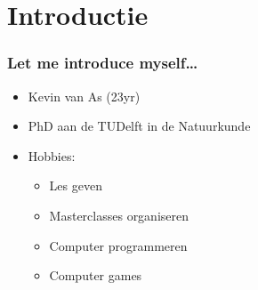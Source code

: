 \section{Introductie}


\begin{frame} %
\frametitle{Let me introduce myself\ldots}

\begin{itemize}
  \item Kevin van As (23yr)
  \pause
  \item PhD aan de TUDelft in de Natuurkunde
  \pause
  \item Hobbies:
  \begin{itemize}
  	\item Les geven
  	\item Masterclasses organiseren
  	\pause
  	\item Computer programmeren
  	\pause
  	\item Computer games
  \end{itemize}
\end{itemize}
\end{frame}

